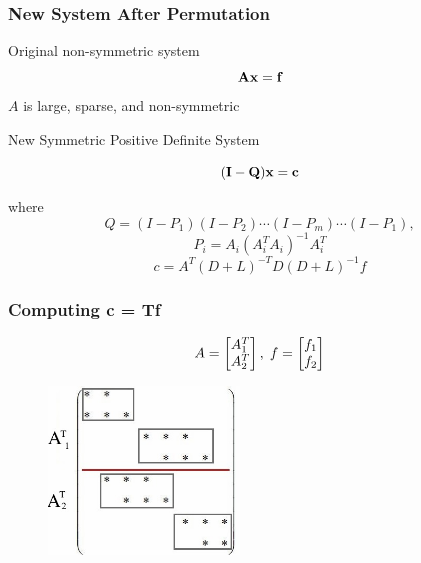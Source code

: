 \documentclass{beamer}
\begin{document}
\begin{frame}
\frametitle{New System After Permutation}

\begin{block}{Original non-symmetric system}
$${\bf A x = f}$$
$A$ is large, sparse, and non-symmetric
\end{block}


\begin{block}{New Symmetric Positive Definite System}

$${\bf (I-Q)x = c} $$

where
$$Q = (I-P_1)(I-P_2) \cdots (I-P_m) \cdots (I-P_1),$$
 $$P_i = A_i(A_i^TA_i)^{-1}A_i^T$$
 $$ c = A^{T}(D+L)^{-T}D(D+L)^{-1}f $$
\end{block}
\end{frame}


\begin{frame}
\frametitle{Computing c = Tf}

%
$$A = \begin{bmatrix} A_1^T  \\ A_2^T \end{bmatrix}, \hspace{.1cm} f = \begin{bmatrix} f_1  \\ f_2 \end{bmatrix}$$
\begin{figure}[htbp] %
   \centering
   \includegraphics[width=2in]{Images/A1A2.jpg}
\end{figure}
\end{frame}
\end{document}
